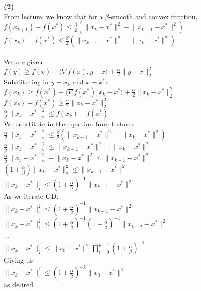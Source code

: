 \documentclass[12pt, letterpaper]{article}
\begin{document}
\newpage
\noindent \large{\textbf{(2)} } \\
From lecture, we know that for a $\beta$-smooth and convex function, \\
$f(x_{k+1})-f(x^*)\leq \frac{\beta}{2}(\lVert x_k-x^*\rVert^2-\lVert x_{k+1}-x^*\rVert^2)$\\
$f(x_k)-f(x^*)\leq \frac{\beta}{2}(\lVert x_{k-1}-x^*\rVert^2-\lVert x_k-x^*\rVert^2)$\\
\\
We are given\\
$f(y)\geq f(x)+\langle \nabla f(x),y-x\rangle + \frac{\alpha}{2}\lVert y-x\rVert^2_2$\\
Substituting in $y=x_k$ and $x=x^*$:\\
$f(x_k)\geq f(x^*)+\langle \nabla f(x^*),x_k-x^*\rangle + \frac{\alpha}{2}\lVert x_k-x^*\rVert^2_2$\\
$f(x_k)-f(x^*)\geq \frac{\alpha}{2}\lVert x_k-x^*\rVert^2_2$\\
$\frac{\alpha}{2}\lVert x_k-x^*\rVert^2_2\leq f(x_k)-f(x^*)$\\
We substitute in the equation from lecture:\\
$\frac{\alpha}{2}\lVert x_k-x^*\rVert^2_2\leq \frac{\beta}{2}(\lVert x_{k-1}-x^*\rVert^2-\lVert x_k-x^*\rVert^2)$\\
$\frac{\alpha}{\beta}\lVert x_k-x^*\rVert^2_2\leq \lVert x_{k-1}-x^*\rVert^2-\lVert x_k-x^*\rVert^2$\\
$\frac{\alpha}{\beta}\lVert x_k-x^*\rVert^2_2+\lVert x_k-x^*\rVert^2\leq \lVert x_{k-1}-x^*\rVert^2$\\
$(1+\frac{\alpha}{\beta})\lVert x_k-x^*\rVert^2_2\leq \lVert x_{k-1}-x^*\rVert^2$\\
$\lVert x_k-x^*\rVert^2_2\leq (1+\frac{\alpha}{\beta})^{-1}\lVert x_{k-1}-x^*\rVert^2$\\
As we iterate GD:\\
$\lVert x_k-x^*\rVert^2_2\leq (1+\frac{\alpha}{\beta})^{-1}\lVert x_{k-1}-x^*\rVert^2$\\
$\lVert x_k-x^*\rVert^2_2\leq (1+\frac{\alpha}{\beta})^{-1}(1+\frac{\alpha}{\beta})^{-1}\lVert x_{k-2}-x^*\rVert^2$\\
...\\
$\lVert x_k-x^*\rVert^2_2\leq \lVert x_0-x^*\rVert^2\prod_{i=0}^{k-1}(1+\frac{\alpha}{\beta})^{-1}$\\
Giving us\\
$\lVert x_k-x^*\rVert^2_2\leq (1+\frac{\alpha}{\beta})^{-k}\lVert x_0-x^*\rVert^2$\\
as desired.
\end{document}
